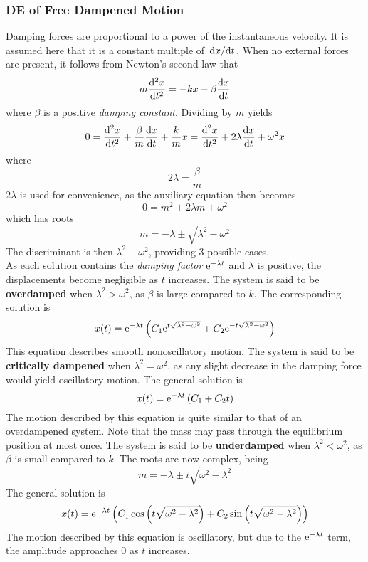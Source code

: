 \documentclass[./Differential Equations.tex]{subfiles}
\begin{document}
			\subsubsection{DE of Free Dampened Motion}
				Damping forces are proportional to a power of the instantaneous velocity. It is assumed here that it is a constant multiple of \(\dv*{x}{t}\). When no external forces are present, it follows from Newton's second law that
					\[m\dv[2]{x}{t} = -kx - \beta\dv{x}{t}\]
					where \(\beta\) is a positive \textit{damping constant}. Dividing by \(m\) yields
					\[
						0 = \dv[2]{x}{t} + \frac{\beta}{m}\dv{x}{t} + \frac{k}{m}x 
							= \dv[2]{x}{t} + 2\lambda\dv{x}{t} + \omega^2x
					\]
					where
					\[2\lambda = \frac{\beta}{m}\]
					\(2\lambda\) is used for convenience, as the auxiliary equation then becomes
					\[0 = m^2 + 2\lambda m + \omega^2\]
					which has roots
					\[m = -\lambda \pm \sqrt{\lambda^2 - \omega^2}\]
					The discriminant is then \(\lambda^2 - \omega^2\), providing 3 possible cases. \\
					As each solution contains the \textit{damping factor} \(\text{e}^{-\lambda t}\) and \(\lambda\) is positive, the displacements become negligible as \(t\) increases.
				The system is said to be \textbf{overdamped} when \(\lambda^2 > \omega^2\), as \(\beta\) is large compared to \(k\). The corresponding solution is
					\[x(t) = \text{e}^{-\lambda t}\left(C_1\text{e}^{t\sqrt{\lambda^2 - \omega^2}} + C_2\text{e}^{-t\sqrt{\lambda^2 - \omega^2}}\right)\]
					This equation describes smooth nonoscillatory motion.
				The system is said to be \textbf{critically dampened} when \(\lambda^2 = \omega^2\), as any slight decrease in the damping force would yield oscillatory motion. The general solution is
					\[x(t) = \text{e}^{-\lambda t}\left(C_1 + C_2t\right)\]
					The motion described by this equation is quite similar to that of an overdampened system. Note that the mass may pass through the equilibrium position at most once.
				The system is said to be \textbf{underdamped} when \(\lambda^2 < \omega^2\), as \(\beta\) is small compared to \(k\). The roots are now complex, being
					\[m = -\lambda \pm i\sqrt{\omega^2 - \lambda^2}\]
					The general solution is
					\[x(t) = \text{e}^{-\lambda t}\left(C_1\cos\left(t\sqrt{\omega^2 - \lambda^2}\right) + C_2\sin\left(t\sqrt{\omega^2 - \lambda^2}\right)\right)\]
					The motion described by this equation is oscillatory, but due to the \(\text{e}^{-\lambda t}\) term, the amplitude approaches 0 as \(t\) increases.
\end{document}
